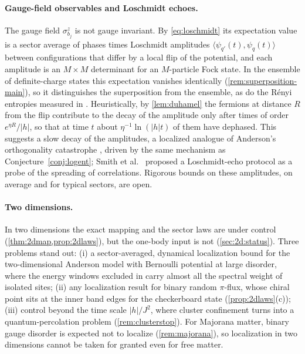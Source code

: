 \paragraph{Gauge-field observables and Loschmidt echoes.}
The gauge field $\sigma^z_{b_j}$ is not gauge invariant.  By \eqref{eq:loschmidt} its expectation value is a sector
average of phases times Loschmidt amplitudes $\langle\psi_{q'}(t),\psi_q(t)\rangle$ between configurations that differ by
a local flip of the potential, and each amplitude is an $M\times M$ determinant for an $M$-particle Fock state.  In
the ensemble of definite-charge states this expectation vanishes identically (\cref{rem:superposition-main}), so it
distinguishes the superposition from the ensemble, as do the R\'enyi entropies measured in \cite{Gyawali2024}.
Heuristically, by \cref{lem:duhamel} the fermions at distance $R$ from the flip contribute to the decay of the amplitude
only after times of order $e^{\eta R}/|h|$, so that at time $t$ about $\eta^{-1}\ln(|h|t)$ of them have dephased.  This
suggests a slow decay of the amplitudes, a localized analogue of Anderson's orthogonality catastrophe
\cite{Anderson1967}, driven by the same mechanism as Conjecture~\ref{conj:logent}; Smith et al.\ \cite{SKKM2019} proposed a
Loschmidt-echo protocol as a probe of the spreading of correlations.  Rigorous bounds on these amplitudes, on average and for typical
sectors, are open.

\paragraph{Two dimensions.}
In two dimensions the exact mapping and the sector laws are under control (\cref{thm:2dmap,prop:2dlaws}), but the
one-body input is not (\cref{sec:2d:status}).  Three problems stand out: (i) a sector-averaged, dynamical
localization bound for the two-dimensional Anderson model with Bernoulli potential at large disorder, where the
energy windows excluded in \cite{LiL2022} carry almost all the spectral weight of isolated sites; (ii) any
localization result for binary random $\pi$-flux, whose chiral point sits at the inner band edges for the
checkerboard state (\cref{prop:2dlaws}(c)); (iii) control beyond the time scale $|h|/J^2$, where cluster
confinement turns into a quantum-percolation problem (\cref{rem:clusterstop}).  For Majorana matter, binary gauge
disorder is expected not to localize (\cref{rem:majorana}), so localization in two dimensions cannot be taken for
granted even for free matter.

